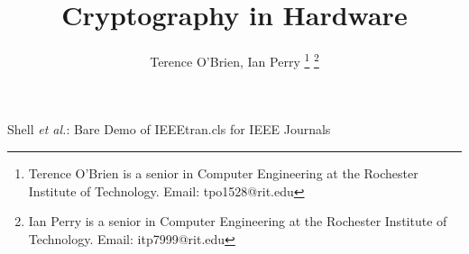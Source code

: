 \documentclass[journal]{IEEEtran}
\begin{document}
%
\title{Cryptography in Hardware}
%
%
%


\author{Terence O'Brien,
        Ian Perry
\thanks{Terence O'Brien is a senior in Computer Engineering at the Rochester Institute of Technology. Email: tpo1528@rit.edu}%
\thanks{Ian Perry is a senior in Computer Engineering at the Rochester Institute of Technology. Email: itp7999@rit.edu }}

% 
%



%
{Shell \MakeLowercase{\textit{et al.}}: Bare Demo of IEEEtran.cls for IEEE Journals}
% 
\end{document}
